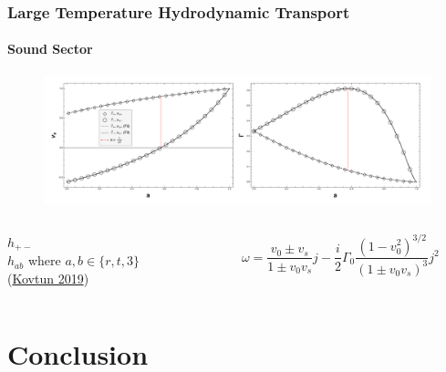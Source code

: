 \documentclass[xcolor=dvipsnames]{beamer}
\begin{document}
\begin{frame}
  \frametitle{Large Temperature Hydrodynamic Transport}
  \framesubtitle{Sound Sector}
  \begin{figure}
    \centering
    \includegraphics[width=0.9\paperwidth]{figs/scalar_rinf_hydro_DiffandPropOverA.pdf}
  \end{figure}

  \begin{columns}[c]
    \begin{column}{0.4\textwidth}
      \(h_{+-}\) \\ \(h_{ab}\) where \(a,b \in \{r,t,3\}\)\\
      (\href{https://inspirehep.net/literature/1744607}{Kovtun 2019})
    \end{column}

    \begin{column}{0.4\textwidth}
      \begin{equation*}
        \omega = \frac{v_0\pm v_s}{1\pm v_0 v_s} j - \frac{i}{2} {\Gamma_0} \frac{(1-v_0^2)^{3/2}}{(1\pm v_0 v_s)^3} j^2
      \end{equation*}
    \end{column}
  \end{columns}

\end{frame}  

\section{Conclusion}
\end{document}
